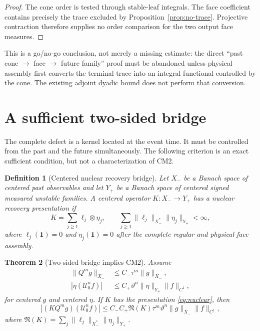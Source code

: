 \documentclass[11pt]{article}
\newtheorem{theorem}{Theorem}[section]
\newtheorem{definition}[theorem]{Definition}
\newcommand{\cU}{\mathcal U}
\newcommand{\one}{\mathbf 1}
\begin{document}
\begin{proof}
The cone order is tested through stable-leaf integrals.  The face coefficient
contains precisely the trace excluded by Proposition~\ref{prop:no-trace}.
Projective contraction therefore supplies no order comparison for the two
output face measures.
\end{proof}

This is a go/no-go conclusion, not merely a missing estimate: the direct
``past cone $\to$ face $\to$ future family'' proof must be abandoned unless
physical assembly first converts the terminal trace into an integral
functional controlled by the cone.  The existing adjoint dyadic bound does
not perform that conversion.

\section{A sufficient two-sided bridge}

The complete defect is a kernel located at the event time.  It must be
controlled from the past and the future simultaneously.  The following
criterion is an exact sufficient condition, but not a characterization of
CM2.

\begin{definition}[Centered nuclear recovery bridge]
Let $X_-$ be a Banach space of centered past observables and let $Y_+$ be a
Banach space of centered signed measured unstable families.  A centered
operator $K:X_-\to Y_+$ has a nuclear recovery presentation if
\begin{equation}
\label{eq:nuclear}
 K=\sum_{j\ge1}\ell_j\otimes\eta_j,
 \qquad
 \sum_{j\ge1}\|\ell_j\|_{X_-^*}\|\eta_j\|_{Y_+}<\infty,
\end{equation}
where $\ell_j(\one)=0$ and $\eta_j(\one)=0$ after the complete regular and
physical-face assembly.
\end{definition}

\begin{theorem}[Two-sided bridge implies CM2]
\label{thm:bridge}
Assume
\begin{align}
 \|Q^mg\|_{X_-}&\le C_-\tau^m\|g\|_{X_-},
       \label{eq:past}\\
 |\eta(\cU_0^nf)|&\le C_+\vartheta^n
       \|\eta\|_{Y_+}\|f\|_{C^1},\label{eq:future}
\end{align}
for centered $g$ and centered $\eta$.  If $K$ has the presentation
\eqref{eq:nuclear}, then
\[
 |(KQ^mg)(\cU_0^nf)|
 \le C_-C_+\mathfrak N(K)\tau^m\vartheta^n
       \|g\|_{X_-}\|f\|_{C^1},
\]
where
$\mathfrak N(K)=\sum_j\|\ell_j\|_{X_-^*}\|\eta_j\|_{Y_+}$.
\end{theorem}
\end{document}
